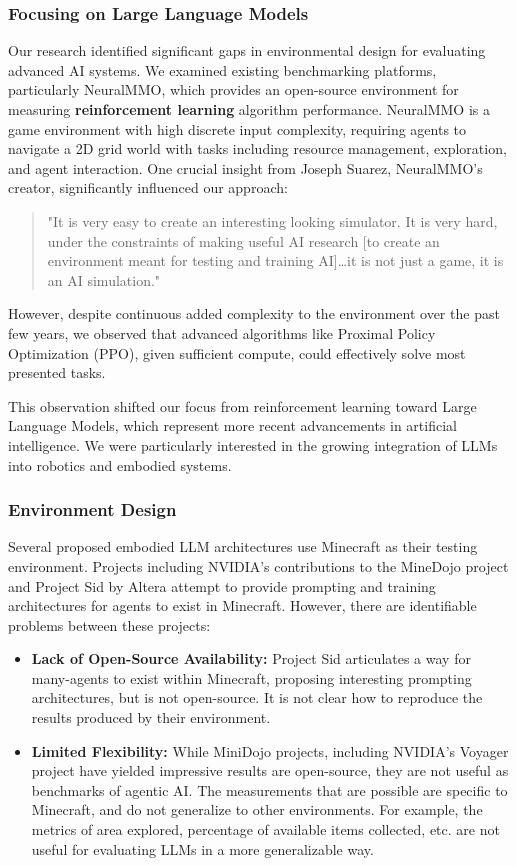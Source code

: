 \documentclass{article}
\begin{document}
\subsubsection{Focusing on Large Language Models}
Our research identified significant gaps in environmental design for evaluating advanced AI systems.
We examined existing benchmarking platforms, particularly NeuralMMO, which provides an open-source environment for measuring \textbf{reinforcement learning} algorithm performance.
NeuralMMO is a game environment with high discrete input complexity, requiring agents to navigate a 2D grid world with tasks including resource management, exploration, and agent interaction.
One crucial insight from Joseph Suarez, NeuralMMO's creator, significantly influenced our approach:
\begin{quote}
    "It is very easy to create an interesting looking simulator. It is very hard, under the constraints of making useful AI research [to create an environment meant for testing and training AI]…it is not just a game, it is an AI simulation."
\end{quote}
However, despite continuous added complexity to the environment over the past few years, we observed that advanced algorithms like Proximal Policy Optimization (PPO), given sufficient compute, could effectively solve most presented tasks.

This observation shifted our focus from reinforcement learning toward Large Language Models, which represent more recent advancements in artificial intelligence.
We were particularly interested in the growing integration of LLMs into robotics and embodied systems.

\subsubsection{Environment Design}
Several proposed embodied LLM architectures use Minecraft as their testing environment.
Projects including NVIDIA's contributions to the MineDojo project and Project Sid by Altera attempt to provide prompting and training architectures for agents to exist in Minecraft.
However, there are identifiable problems between these projects:
\begin{itemize}
    \item \textbf{Lack of Open-Source Availability:} Project Sid articulates a way for many-agents to exist within Minecraft, proposing interesting prompting architectures, but is not open-source. It is not clear how to reproduce the results produced by their environment.
    \item \textbf{Limited Flexibility:} While MiniDojo projects, including NVIDIA's Voyager project have yielded impressive results are open-source, they are not useful as benchmarks of agentic AI. The measurements that are possible are specific to Minecraft, and do not generalize to other environments. For example, the metrics of area explored, percentage of available items collected, etc. are not useful for evaluating LLMs in a more generalizable way.
\end{itemize}
\end{document}
